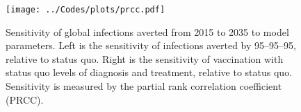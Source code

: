 \documentclass{article}
\begin{document}
\begin{figure}
   \centering
   \texttt{[image: ../Codes/plots/prcc.pdf]}
   \caption{Sensitivity of global infections averted from
     2015 to 2035 to model parameters.  Left is the sensitivity of
     infections averted by 95--95--95, relative to status quo.  Right
     is the sensitivity of vaccination with status quo levels of
     diagnosis and treatment, relative to status quo.  Sensitivity is
     measured by the partial rank correlation coefficient (PRCC).}
   \label{PRCCs}
\end{figure}
\end{document}
